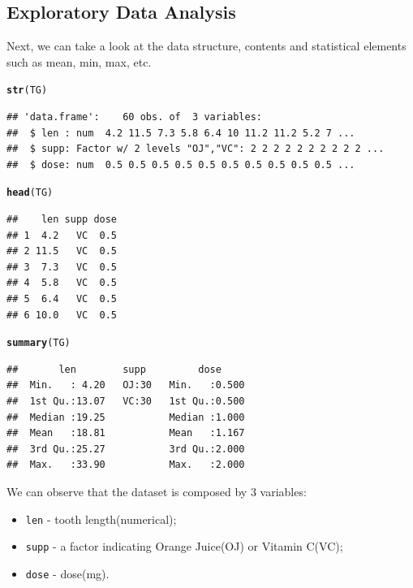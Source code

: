 \documentclass[a4paper, 12pt]{article}\usepackage[]{graphicx}\usepackage[]{color}
\makeatletter
\newcommand{\hlstd}[1]{\textcolor[rgb]{0.345,0.345,0.345}{#1}}%
\newcommand{\hlkwd}[1]{\textcolor[rgb]{0.737,0.353,0.396}{\textbf{#1}}}%
\newenvironment{kframe}{%
 \def\at@end@of@kframe{}%
 \ifinner\ifhmode%
  \def\at@end@of@kframe{\end{minipage}}%
  \begin{minipage}{\columnwidth}%
 \fi\fi%
 \def\FrameCommand##1{\hskip\@totalleftmargin \hskip-\fboxsep
 \colorbox{shadecolor}{##1}\hskip-\fboxsep
     \hskip-\linewidth \hskip-\@totalleftmargin \hskip\columnwidth}%
 \MakeFramed {\advance\hsize-\width
   \@totalleftmargin\z@ \linewidth\hsize
   \@setminipage}}%
 {\par\unskip\endMakeFramed%
 \at@end@of@kframe}
\newenvironment{knitrout}{}{} %
\makeatother
\begin{document}
        \subsection{Exploratory Data Analysis}
        Next, we can take a look at the data structure, contents and statistical elements such as mean, min, max, etc.
\begin{knitrout}\small
{}\color{fgcolor}\begin{kframe}
\begin{alltt}
\hlkwd{str}\hlstd{(TG)}
\end{alltt}
\begin{verbatim}
## 'data.frame':	60 obs. of  3 variables:
##  $ len : num  4.2 11.5 7.3 5.8 6.4 10 11.2 11.2 5.2 7 ...
##  $ supp: Factor w/ 2 levels "OJ","VC": 2 2 2 2 2 2 2 2 2 2 ...
##  $ dose: num  0.5 0.5 0.5 0.5 0.5 0.5 0.5 0.5 0.5 0.5 ...
\end{verbatim}
\begin{alltt}
\hlkwd{head}\hlstd{(TG)}
\end{alltt}
\begin{verbatim}
##    len supp dose
## 1  4.2   VC  0.5
## 2 11.5   VC  0.5
## 3  7.3   VC  0.5
## 4  5.8   VC  0.5
## 5  6.4   VC  0.5
## 6 10.0   VC  0.5
\end{verbatim}
\begin{alltt}
\hlkwd{summary}\hlstd{(TG)}
\end{alltt}
\begin{verbatim}
##       len        supp         dose      
##  Min.   : 4.20   OJ:30   Min.   :0.500  
##  1st Qu.:13.07   VC:30   1st Qu.:0.500  
##  Median :19.25           Median :1.000  
##  Mean   :18.81           Mean   :1.167  
##  3rd Qu.:25.27           3rd Qu.:2.000  
##  Max.   :33.90           Max.   :2.000
\end{verbatim}
\end{kframe}
\end{knitrout}
	We can observe that the dataset is composed by 3 variables:
	\begin{itemize}
		\item \texttt{len} - tooth length(numerical);
		\item \texttt{supp} - a factor indicating Orange Juice(OJ) or Vitamin C(VC);
		\item \texttt{dose} - dose(mg).		
	\end{itemize}
	
\end{document}
